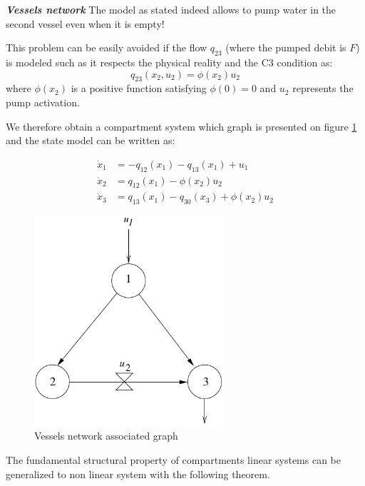 \begin{exemple}{\bf \em Vessels network}
The model as stated indeed allows to pump water in the second vessel even when it is empty!

This problem can be easily avoided if the flow $q_{23}$ (where the pumped debit is $F$) is modeled such as it respects the physical reality and 
the C3 condition as:
$$q_{23}(x_2,u_2) = \phi(x_2)u_2$$
where $\phi(x_2)$ is a positive function satisfying $\phi(0) = 0$ and
$u_2$ represents the pump activation.

We therefore obtain a compartment system which graph is presented on figure \ref{Fig:graphreseau} and the state model can be written as:

\begin{equation*} \begin{split}
\dot x_1 &= - q_{12}(x_1) - q_{13}(x_1) + u_1 \\
\dot x_2 &=  q_{12}(x_1) - \phi(x_2)u_2 \\
\dot x_3 &= q_{13}(x_1) - q_{30}(x_3) + \phi(x_{2})u_2 
\end{split} \end{equation*}
\begin{figure}[h] 
\begin{center}
\includegraphics[width=7cm]{images/graphreseau}
\caption{Vessels network associated graph}
\label{Fig:graphreseau}
\end{center} 
\end{figure}
\cqfd
\end{exemple}
The fundamental structural property of compartments linear systems can be generalized to non linear system with the following theorem.

